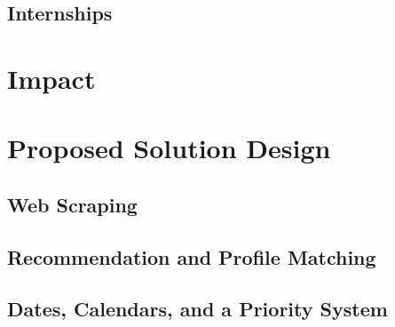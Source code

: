 \documentclass[english]{proposalnsf}
\begin{document}
	
	\subsection{Internships}
	

	
	\section{Impact}
	\label{impact}
	
	
	\section{Proposed Solution Design}
	\label{solution-design}
	
		\subsection{Web Scraping}
		
		\subsection{Recommendation and Profile Matching}
		
		\subsection{Dates, Calendars, and a Priority System}
		
	
\end{document}
